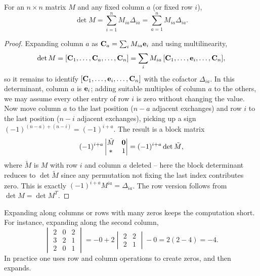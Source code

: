 \documentclass[a4paper]{scrartcl}
\begin{document}
\begin{theorem}
	For an $n \times n$ matrix $M$ and any fixed column $a$ (or fixed row $i$),
	$$
	\det M = \sum_{i = 1}^n M_{ia}\Delta_{ia} = \sum_{a = 1}^n M_{ia}\Delta_{ia}.
	$$
\end{theorem}
\begin{proof}
	Expanding column $a$ as $\mathbf{C}_a = \sum_i M_{ia}\mathbf{e}_i$ and using multilinearity,
	$$
	\det M = [\mathbf{C}_1, \dots, \mathbf{C}_a, \dots, \mathbf{C}_n] = \sum_i M_{ia}\, [\mathbf{C}_1, \dots, \mathbf{e}_i, \dots, \mathbf{C}_n],
	$$
	so it remains to identify $[\mathbf{C}_1, \dots, \mathbf{e}_i, \dots, \mathbf{C}_n]$ with the cofactor $\Delta_{ia}$. In this determinant, column $a$ is $\mathbf{e}_i$; adding suitable multiples of column $a$ to the others, we may assume every other entry of row $i$ is zero without changing the value. Now move column $a$ to the last position ($n - a$ adjacent exchanges) and row $i$ to the last position ($n - i$ adjacent exchanges), picking up a sign $(-1)^{(n-a) + (n - i)} = (-1)^{i + a}$. The result is a block matrix
	$$
	(-1)^{i+a}\begin{vmatrix}
		\tilde{M} & \mathbf{0} \\
		* & 1
	\end{vmatrix} = (-1)^{i + a}\det \tilde{M},
	$$
	where $\tilde{M}$ is $M$ with row $i$ and column $a$ deleted -- here the block determinant reduces to $\det \tilde M$ since any permutation not fixing the last index contributes zero. This is exactly $(-1)^{i+a}M^{ia} = \Delta_{ia}$. The row version follows from $\det M = \det M^T$.
\end{proof}

\begin{example}
	Expanding along columns or rows with many zeros keeps the computation short. For instance, expanding along the second column,
	$$
	\begin{vmatrix}
		2 & 0 & 2 \\
		3 & 2 & 1 \\
		2 & 0 & 1
	\end{vmatrix}
	= - 0 + 2\begin{vmatrix} 2 & 2 \\ 2 & 1\end{vmatrix} - 0 = 2(2 - 4) = -4.
	$$
	In practice one uses row and column operations to create zeros, and then expands.
\end{example}
\end{document}
